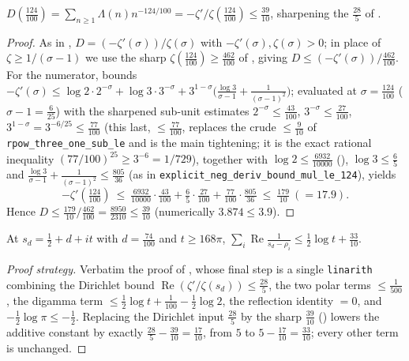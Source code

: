 \begin{lemma}[Sharp Dirichlet constant at $\sigma=\tfrac{124}{100}$]
\label{lem:ls_dirichlet_sharp}
\leanok
$D(\tfrac{124}{100})=\sum_{n\ge1}\Lambda(n)n^{-124/100}=-\zeta'/\zeta(\tfrac{124}{100})\le\tfrac{39}{10}$,
sharpening the $\tfrac{28}5$ of .
\end{lemma}

\begin{proof}
\leanok
As in , $D=(-\zeta'(\sigma))/\zeta(\sigma)$ with $-\zeta'(\sigma),\zeta(\sigma)>0$;
in place of $\zeta\ge1/(\sigma-1)$ we use the sharp $\zeta(\tfrac{124}{100})\ge\tfrac{462}{100}$
of , giving $D\le(-\zeta'(\sigma))/\tfrac{462}{100}$. For the
numerator,  bounds
$-\zeta'(\sigma)\le\log2\cdot2^{-\sigma}+\log3\cdot3^{-\sigma}
+3^{1-\sigma}\bigl(\tfrac{\log3}{\sigma-1}+\tfrac1{(\sigma-1)^2}\bigr)$; evaluated at
$\sigma=\tfrac{124}{100}$ ($\sigma-1=\tfrac6{25}$) with the sharpened sub-unit estimates
$2^{-\sigma}\le\tfrac{43}{100}$, $3^{-\sigma}\le\tfrac{27}{100}$,
$3^{1-\sigma}=3^{-6/25}\le\tfrac{77}{100}$ (this last, $\le\tfrac{77}{100}$, replaces the crude
$\le\tfrac9{10}$ of \texttt{rpow\_three\_one\_sub\_le} and is the main tightening; it is
the exact rational inequality $(77/100)^{25}\ge3^{-6}=1/729$), together with $\log2\le\tfrac{6932}{10000}$
(), $\log3\le\tfrac65$ and
$\tfrac{\log3}{\sigma-1}+\tfrac1{(\sigma-1)^2}\le\tfrac{805}{36}$ (as in
\texttt{explicit\_neg\_deriv\_bound\_mul\_le\_124}), yields
\[
  -\zeta'(\tfrac{124}{100})\ \le\ \tfrac{6932}{10000}\cdot\tfrac{43}{100}
    +\tfrac65\cdot\tfrac{27}{100}+\tfrac{77}{100}\cdot\tfrac{805}{36}\ \le\ \tfrac{179}{10}\ (=17.9).
\]
Hence $D\le\tfrac{179}{10}\big/\tfrac{462}{100}=\tfrac{8950}{2310}\le\tfrac{39}{10}$
(numerically $3.874\le3.9$).
\end{proof}

\begin{lemma}
\label{lem:ls_Cpsi_sharp}
\leanok
At $s_d=\tfrac12+d+it$ with $d=\tfrac{74}{100}$ and $t\ge168\pi$,
$\sum_i\operatorname{Re}\tfrac1{s_d-\rho_i}\le\tfrac12\log t+\tfrac{33}{10}$.
\end{lemma}

\begin{proof}[Proof strategy]
\leanok
Verbatim the proof of , whose final
step is a single \texttt{linarith} combining the Dirichlet bound
$\operatorname{Re}(\zeta'/\zeta(s_d))\le\tfrac{28}5$, the two polar terms
$\le\tfrac1{500}$, the digamma term $\le\tfrac12\log t+\tfrac1{100}-\tfrac12\log2$, the reflection
identity $=0$, and $-\tfrac12\log\pi\le-\tfrac12$. Replacing the Dirichlet input $\tfrac{28}5$ by the
sharp $\tfrac{39}{10}$ () lowers the additive constant by exactly
$\tfrac{28}5-\tfrac{39}{10}=\tfrac{17}{10}$, from $5$ to $5-\tfrac{17}{10}=\tfrac{33}{10}$; every other
term is unchanged.
\end{proof}

